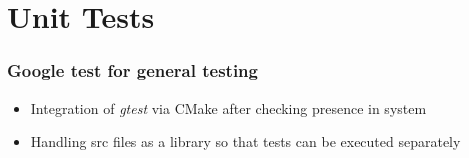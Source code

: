 \section{Unit Tests}

\begin{frame}
    \frametitle{Google test for general testing}

    \begin{itemize}
        \item Integration of \emph{gtest} via CMake after checking presence in system
        \item Handling src files as a library so that tests can be executed separately
    \end{itemize}

\end{frame}